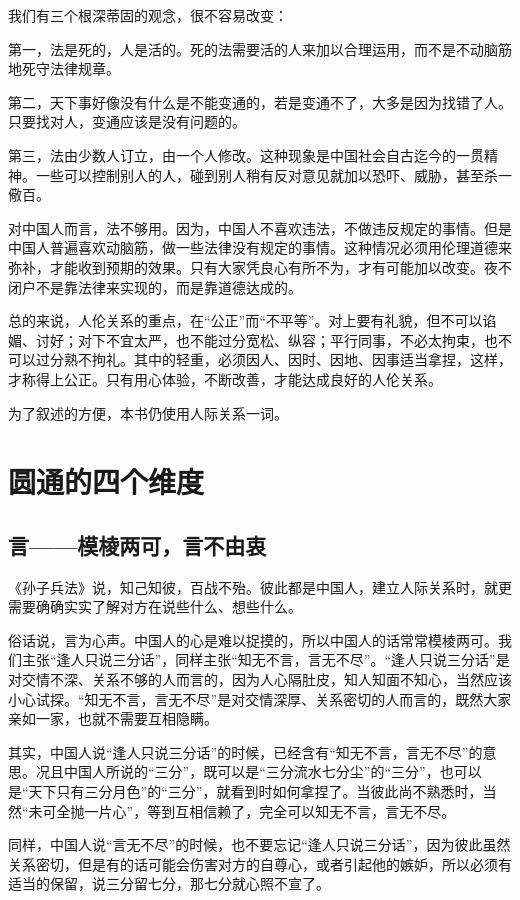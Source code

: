 \documentclass[fontset=fandol, a4paper, 12pt, openright]{ctexbook}
\begin{document}
我们有三个根深蒂固的观念，很不容易改变：

第一，法是死的，人是活的。死的法需要活的人来加以合理运用，而不是不动脑筋地死守法律规章。

第二，天下事好像没有什么是不能变通的，若是变通不了，大多是因为找错了人。只要找对人，变通应该是没有问题的。

第三，法由少数人订立，由一个人修改。这种现象是中国社会自古迄今的一贯精神。一些可以控制别人的人，碰到别人稍有反对意见就加以恐吓、威胁，甚至杀一儆百。

对中国人而言，法不够用。因为，中国人不喜欢违法，不做违反规定的事情。但是中国人普遍喜欢动脑筋，做一些法律没有规定的事情。这种情况必须用伦理道德来弥补，才能收到预期的效果。只有大家凭良心有所不为，才有可能加以改变。夜不闭户不是靠法律来实现的，而是靠道德达成的。

总的来说，人伦关系的重点，在“公正”而“不平等”。对上要有礼貌，但不可以谄媚、讨好；对下不宜太严，也不能过分宽松、纵容；平行同事，不必太拘束，也不可以过分熟不拘礼。其中的轻重，必须因人、因时、因地、因事适当拿捏，这样，才称得上公正。只有用心体验，不断改善，才能达成良好的人伦关系。

为了叙述的方便，本书仍使用人际关系一词。

\mainmatter

\part{圆通的四个维度}

\chapter{言——模棱两可，言不由衷}
《孙子兵法》说，知己知彼，百战不殆。彼此都是中国人，建立人际关系时，就更需要确确实实了解对方在说些什么、想些什么。

俗话说，言为心声。中国人的心是难以捉摸的，所以中国人的话常常模棱两可。我们主张“逢人只说三分话”，同样主张“知无不言，言无不尽”。“逢人只说三分话”是对交情不深、关系不够的人而言的，因为人心隔肚皮，知人知面不知心，当然应该小心试探。“知无不言，言无不尽”是对交情深厚、关系密切的人而言的，既然大家亲如一家，也就不需要互相隐瞒。

其实，中国人说“逢人只说三分话”的时候，已经含有“知无不言，言无不尽”的意思。况且中国人所说的“三分”，既可以是“三分流水七分尘”的“三分”，也可以是“天下只有三分月色”的“三分”，就看到时如何拿捏了。当彼此尚不熟悉时，当然“未可全抛一片心”，等到互相信赖了，完全可以知无不言，言无不尽。

同样，中国人说“言无不尽”的时候，也不要忘记“逢人只说三分话”，因为彼此虽然关系密切，但是有的话可能会伤害对方的自尊心，或者引起他的嫉妒，所以必须有适当的保留，说三分留七分，那七分就心照不宣了。
\end{document}
